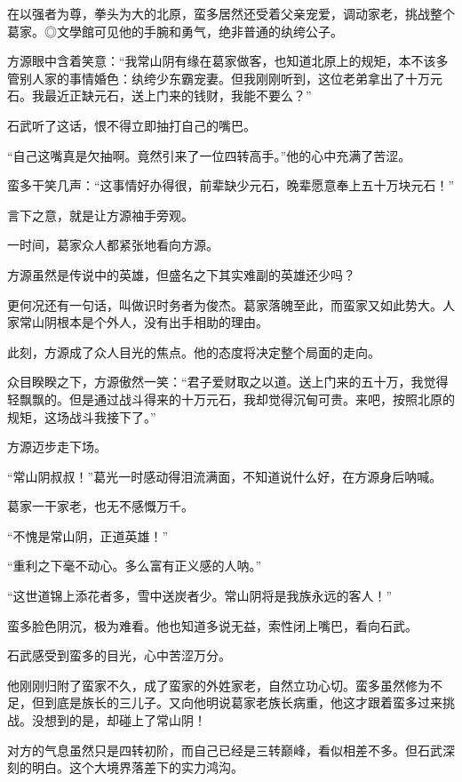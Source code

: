
\begin{this_body}

在以强者为尊，拳头为大的北原，蛮多居然还受着父亲宠爱，调动家老，挑战整个葛家。◎文學館可见他的手腕和勇气，绝非普通的纨绔公子。

方源眼中含着笑意：“我常山阴有缘在葛家做客，也知道北原上的规矩，本不该多管别人家的事情婚色：纨绔少东霸宠妻。但我刚刚听到，这位老弟拿出了十万元石。我最近正缺元石，送上门来的钱财，我能不要么？”

石武听了这话，恨不得立即抽打自己的嘴巴。

“自己这嘴真是欠抽啊。竟然引来了一位四转高手。”他的心中充满了苦涩。

蛮多干笑几声：“这事情好办得很，前辈缺少元石，晚辈愿意奉上五十万块元石！”

言下之意，就是让方源袖手旁观。

一时间，葛家众人都紧张地看向方源。

方源虽然是传说中的英雄，但盛名之下其实难副的英雄还少吗？

更何况还有一句话，叫做识时务者为俊杰。葛家落魄至此，而蛮家又如此势大。人家常山阴根本是个外人，没有出手相助的理由。

此刻，方源成了众人目光的焦点。他的态度将决定整个局面的走向。

众目睽睽之下，方源傲然一笑：“君子爱财取之以道。送上门来的五十万，我觉得轻飘飘的。但是通过战斗得来的十万元石，我却觉得沉甸可贵。来吧，按照北原的规矩，这场战斗我接下了。”

方源迈步走下场。

“常山阴叔叔！”葛光一时感动得泪流满面，不知道说什么好，在方源身后呐喊。

葛家一干家老，也无不感慨万千。

“不愧是常山阴，正道英雄！”

“重利之下毫不动心。多么富有正义感的人呐。”

“这世道锦上添花者多，雪中送炭者少。常山阴将是我族永远的客人！”

蛮多脸色阴沉，极为难看。他也知道多说无益，索性闭上嘴巴，看向石武。

石武感受到蛮多的目光，心中苦涩万分。

他刚刚归附了蛮家不久，成了蛮家的外姓家老，自然立功心切。蛮多虽然修为不足，但到底是族长的三儿子。又向他明说葛家老族长病重，他这才跟着蛮多过来挑战。没想到的是，却碰上了常山阴！

对方的气息虽然只是四转初阶，而自己已经是三转巅峰，看似相差不多。但石武深刻的明白。这个大境界落差下的实力鸿沟。


\end{this_body}
